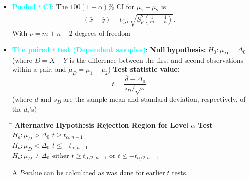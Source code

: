 \documentclass{report}
\begin{document}
\begin{itemize}
    \item \textbf{\textcolor{cyan}{Pooled $t$ CI}}: The $100(1-\alpha)\%$ CI for $\mu_{1} - \mu_{2}$ is 
        \begin{align*}
            (\bar{x} - \bar{y}) \pm t_{\frac{\alpha}{2}, \nu} \sqrt{S_{p}^{2}\left(\frac{1}{m} + \frac{1}{n}\right)}
        .\end{align*}
        With $\nu = m + n - 2$ degrees of freedom
    \item \textbf{\textcolor{cyan}{The paired $t$ test (Dependent samples)}}:
        \bigbreak \noindent 
        \textbf{Null hypothesis:} $H_0: \mu_D = \Delta_0$ \\
        (where $D = X - Y$ is the difference between the first and second observations within a pair, and $\mu_D = \mu_1 - \mu_2$)
        \bigbreak \noindent 
        \textbf{Test statistic value:}
        \[
            t = \frac{\overline{d} - \Delta_0}{s_D / \sqrt{n}}
        \]
        (where $\overline{d}$ and $s_D$ are the sample mean and standard deviation, respectively, of the $d_i$'s)
        \bigbreak \noindent 
        \begin{tabbing}
            \hspace{3cm} \= \kill
            \textbf{Alternative Hypothesis} \hspace{1.8cm} \textbf{Rejection Region for Level $\alpha$ Test} \\
            $H_a: \mu_D > \Delta_0$ \hspace{3.7cm} $t \ge t_{\alpha, n-1}$ \\
            $H_a: \mu_D < \Delta_0$ \hspace{3.7cm} $t \le -t_{\alpha, n-1}$ \\
            $H_a: \mu_D \neq \Delta_0$ \hspace{3.7cm} either $t \ge t_{\alpha/2, n-1}$ or $t \le -t_{\alpha/2, n-1}$ \\
        \end{tabbing}
        \bigbreak \noindent 
        A $P$-value can be calculated as was done for earlier $t$ tests.


\end{itemize}
\end{document}
